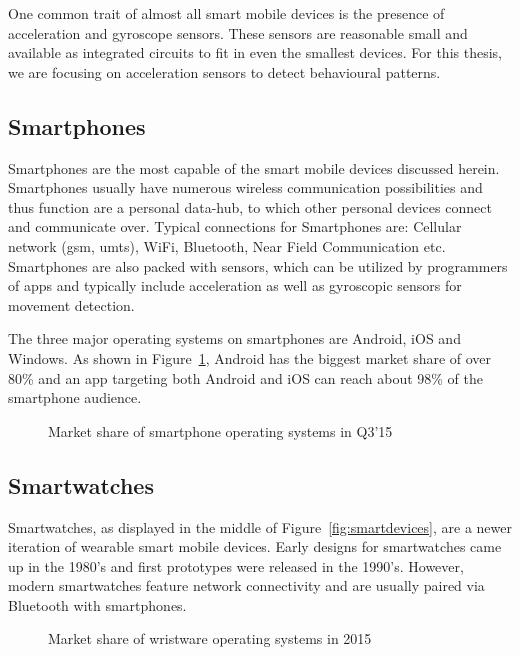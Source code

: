 One common trait of almost all smart mobile devices is the presence of acceleration and gyroscope sensors. These sensors are reasonable small and available as integrated circuits to fit in even the smallest devices. For this thesis, we are focusing on acceleration sensors to detect behavioural patterns.

\subsection{Smartphones}
Smartphones are the most capable of the smart mobile devices discussed herein. Smartphones usually have numerous wireless communication possibilities and thus function are a personal data-hub, to which other personal devices connect and communicate over. Typical connections for Smartphones are: Cellular network (\eg \acrshort{gsm}, \acrshort{umts}), WiFi, Bluetooth, Near Field Communication etc. Smartphones are also packed with sensors, which can be utilized by programmers of \glspl{app} and typically include acceleration as well as gyroscopic sensors for movement detection.

The three major operating systems on smartphones are Android, iOS and Windows. As shown in Figure~\ref{fig:smartphoneosmarketshare}, Android has the biggest market share of over 80\% and an \gls{app} targeting both Android and iOS can reach about 98\% of the smartphone audience.

\begin{figure}
    \centering
    
    \caption{Market share of smartphone operating systems in Q3'15\cite{gartner2015smartosmarketshare}}
    \label{fig:smartphoneosmarketshare}
\end{figure}

\subsection{Smartwatches}
Smartwatches, as displayed in the middle of Figure~\ref{fig:smartdevices}, are a newer iteration of wearable smart mobile devices. Early designs for smartwatches came up in the 1980's and first prototypes were released in the 1990's. However, modern smartwatches feature network connectivity and are usually paired via Bluetooth with smartphones.

\begin{figure}
    \centering
    
    \caption{Market share of wristware operating systems in 2015\cite{idc2015wristmarketshare}}
    \label{fig:my_label}
\end{figure}

